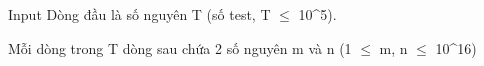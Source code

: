 Input
Dòng đầu là số nguyên T (số test, T  $\le$  10^5).

Mỗi dòng trong T dòng sau chứa 2 số nguyên m và n (1  $\le$  m, n  $\le$  10^16)